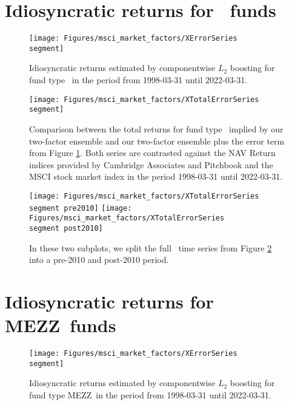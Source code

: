 \section{Idiosyncratic returns for \segment \ funds}
\label{sec:errors_\segment}

\begin{figure}[H]
	\centering
	\texttt{[image: Figures/msci\_market\_factors/XErrorSeries\\segment]}
	\caption{Idiosyncratic returns estimated by componentwise $L_2$ boosting for fund type \segment \ in the period from 1998-03-31 until 2022-03-31.}
	\label{fig:clb_idio_\segment}
\end{figure}

\begin{figure}[H]
	\centering
	\texttt{[image: Figures/msci\_market\_factors/XTotalErrorSeries\\segment]}
	\caption{
		Comparison between the total returns for fund type \segment \ implied by our two-factor ensemble and our two-factor ensemble plus the error term from Figure \ref{fig:clb_idio_\segment}.
		Both series are contrasted against the NAV Return indices provided by Cambridge Associates and Pitchbook and the MSCI stock market index in the period 1998-03-31 until 2022-03-31.
	}
	\label{fig:clb_total_\segment}
\end{figure}

\begin{figure}[H]
	\centering
	\texttt{[image: Figures/msci\_market\_factors/XTotalErrorSeries\\segment pre2010]}
	\texttt{[image: Figures/msci\_market\_factors/XTotalErrorSeries\\segment post2010]}
	\caption{
		In these two subplots, we split the full \segment \ time series from Figure \ref{fig:clb_total_\segment} into a pre-2010 and post-2010 period.
	}
	\label{fig:clb_pre_post_2010_\segment}
\end{figure}


\renewcommand{\segment}{MEZZ}

\section{Idiosyncratic returns for \segment \ funds}
\label{sec:errors_\segment}

\begin{figure}[H]
	\centering
	\texttt{[image: Figures/msci\_market\_factors/XErrorSeries\\segment]}
	\caption{Idiosyncratic returns estimated by componentwise $L_2$ boosting for fund type \segment \ in the period from 1998-03-31 until 2022-03-31.}
	\label{fig:clb_idio_\segment}
\end{figure}

